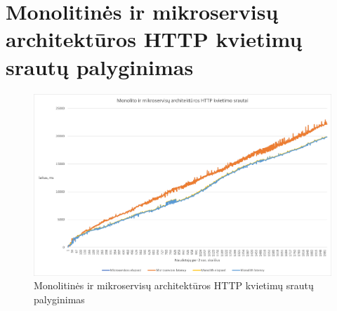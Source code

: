\documentclass{VUMIFPSbakalaurinis}
\begin{document}
\section{Monolitinės ir mikroservisų architektūros HTTP kvietimų srautų palyginimas}
\begin{figure}[H]
    \centering
    \includegraphics[scale=0.6]{img/latency.png}
    \caption{Monolitinės ir mikroservisų architektūros HTTP kvietimų srautų palyginimas}
    \label{img:latency}
\end{figure}
\end{document}
